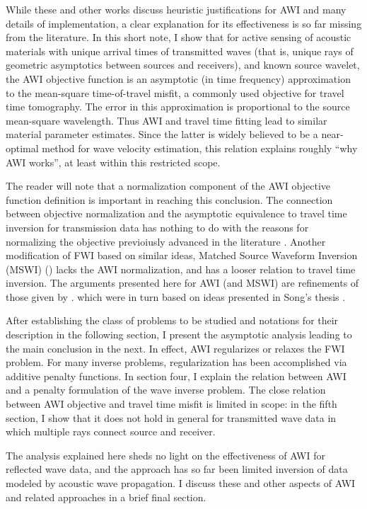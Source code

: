 While these and other works discuss heuristic justifications for AWI and
many details of implementation, a clear explanation for its effectiveness is 
so far missing from the literature. In this short note, I show that
for active sensing of acoustic materials with unique arrival times of
transmitted waves
(that is, unique rays of geometric asymptotics between sources and
receivers), and known source wavelet, the AWI objective function is an asymptotic (in time
frequency) approximation to the
mean-square time-of-travel misfit, a commonly used objective for
travel time tomography. The error in this approximation is
proportional to the source mean-square wavelength. Thus AWI and travel time fitting
lead to similar material parameter estimates. Since the latter is
widely believed to be a near-optimal method for wave velocity
estimation, this relation explains roughly ``why AWI works'', at
least within this restricted scope.

The reader will
note that a normalization component of the AWI objective function
definition is important in reaching this conclusion. The connection
between objective normalization and the asymptotic equivalence to
travel time inversion for transmission data has nothing to do with the
reasons for normalizing the objective previoiusly advanced in the
literature \cite[]{Warner:16,LiAlkhalifah:21}. Another modification of
FWI based on similar ideas, Matched Source Waveform Inversion (MSWI)
(\cite{HuangSymes2015SEG,HuangSymes:Geo17}) lacks the AWI
normalization, and has a looser relation to travel time inversion. The
arguments presented here for AWI (and MSWI) are refinements of those
given by \cite{HuangSymes:Geo17}. which were in turn based on ideas
presented in Song's thesis \cite[]{Song:94c}.

After establishing the class of problems to be studied and notations
for their description in the following section, I present the
asymptotic analysis leading to the main conclusion in the next. In
effect, AWI regularizes or relaxes the FWI problem. For many inverse
problems, regularization has been accomplished via additive penalty
functions. In section four, I explain the relation between AWI and a
penalty formulation of the wave inverse problem. The
close relation between AWI objective and travel time misfit is limited
in scope: in the fifth section, I show that it does not hold in
general for transmitted wave data in which multiple rays connect
source and receiver. 

The analysis explained here sheds no light on the effectiveness of AWI
for reflected wave data, and the approach has so far been limited
inversion of data modeled by acoustic wave propagation. I discuss
these and other aspects of AWI and related approaches in a brief final
section.

